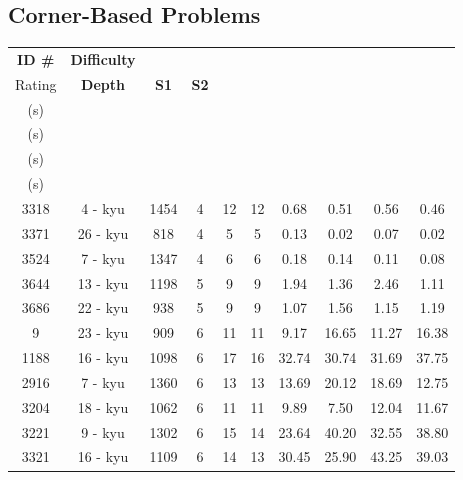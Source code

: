 \documentclass{l4proj}
\begin{document}
\begin{appendices}
\section{Corner-Based Problems}
\begin{longtable}{|c|c|c|c|c|c|c|c|c|c|}
\hline
\textbf{ID \#} & \textbf{Difficulty} & \textbf{\begin{tabular}[c]{@{}c@{}}Difficulty \\ Rating\end{tabular}} & \textbf{Depth} & \textbf{S1} & \textbf{S2} & \textbf{\begin{tabular}[c]{@{}c@{}}T1 \\ (s)\end{tabular}} & \textbf{\begin{tabular}[c]{@{}c@{}}T2 \\ (s)\end{tabular}} & \textbf{\begin{tabular}[c]{@{}c@{}}T3 \\ (s)\end{tabular}} & \textbf{\begin{tabular}[c]{@{}c@{}}T4 \\ (s)\end{tabular}} \\ \hline
\endfirsthead
%
\endhead
%
3318 & 4 - kyu & 1454 & 4 & 12 & 12 & 0.68 & 0.51 & 0.56 & 0.46 \\ \hline
3371 & 26 - kyu & 818 & 4 & 5 & 5 & 0.13 & 0.02 & 0.07 & 0.02 \\ \hline
3524 & 7 - kyu & 1347 & 4 & 6 & 6 & 0.18 & 0.14 & 0.11 & 0.08 \\ \hline
3644 & 13 - kyu & 1198 & 5 & 9 & 9 & 1.94 & 1.36 & 2.46 & 1.11 \\ \hline
3686 & 22 - kyu & 938 & 5 & 9 & 9 & 1.07 & 1.56 & 1.15 & 1.19 \\ \hline
9 & 23 - kyu & 909 & 6 & 11 & 11 & 9.17 & 16.65 & 11.27 & 16.38 \\ \hline
1188 & 16 - kyu & 1098 & 6 & 17 & 16 & 32.74 & 30.74 & 31.69 & 37.75 \\ \hline
2916 & 7 - kyu & 1360 & 6 & 13 & 13 & 13.69 & 20.12 & 18.69 & 12.75 \\ \hline
3204 & 18 - kyu & 1062 & 6 & 11 & 11 & 9.89 & 7.50 & 12.04 & 11.67 \\ \hline
3221 & 9 - kyu & 1302 & 6 & 15 & 14 & 23.64 & 40.20 & 32.55 & 38.80 \\ \hline
3321 & 16 - kyu & 1109 & 6 & 14 & 13 & 30.45 & 25.90 & 43.25 & 39.03 \\ \hline

\end{longtable}
\end{appendices}
\end{document}
